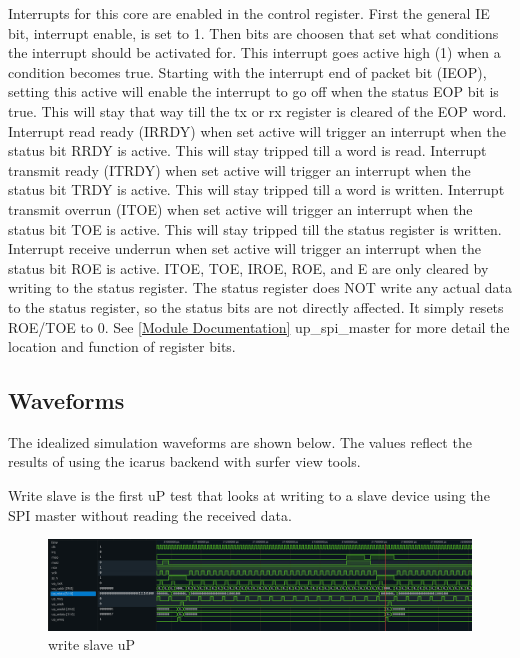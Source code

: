 \par
Interrupts for this core are enabled in the control register. First the general IE bit, interrupt enable, is set to 1. Then bits
are choosen that set what conditions the interrupt should be activated for. This interrupt goes active high (1) when a condition becomes
true. Starting with the interrupt end of packet bit (IEOP), setting this active will enable the interrupt to go off when the status EOP bit
is true. This will stay that way till the tx or rx register is cleared of the EOP word. Interrupt read ready (IRRDY) when set active will trigger
an interrupt when the status bit RRDY is active. This will stay tripped till a word is read. Interrupt transmit ready (ITRDY) when set active will
trigger an interrupt when the status bit TRDY is active. This will stay tripped till a word is written. Interrupt transmit overrun (ITOE) when set
active will trigger an interrupt when the status bit TOE is active. This will stay tripped till the status register is written. Interrupt receive
underrun when set active will trigger an interrupt when the status bit ROE is active. ITOE, TOE, IROE, ROE, and E are only cleared by writing to the
status register. The status register does NOT write any actual data to the status register, so the status bits are not directly affected. It simply
resets ROE/TOE to 0. See \ref{Module Documentation} up\_spi\_master for more detail the location and function of register bits.

\subsection{Waveforms}
The idealized simulation waveforms are shown below. The values reflect the results of using the icarus backend with surfer view tools.

\par
Write slave is the first uP test that looks at writing to a slave device using the SPI master without reading the received data.
\begin{figure}[H]
\caption{write slave uP}
\centering
\includegraphics[width=\textwidth]{img/diagrams/waveform_write_slave_up.png}
\end{figure}

